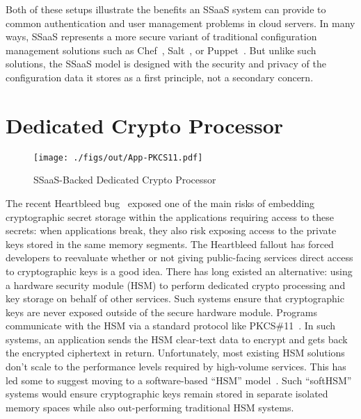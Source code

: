 Both of these setups illustrate the benefits an SSaaS system can
provide to common authentication and user management problems in cloud
servers. In many ways, SSaaS represents a more secure variant of
traditional configuration management solutions such as
Chef~\cite{chef}, Salt~\cite{salt}, or Puppet~\cite{puppet}. But
unlike such solutions, the SSaaS model is designed with the security
and privacy of the configuration data it stores as a first principle,
not a secondary concern.

\section{Dedicated Crypto Processor}

\begin{figure}[t]
  \centering
  \texttt{[image: ./figs/out/App-PKCS11.pdf]}
  \caption{SSaaS-Backed Dedicated Crypto Processor}
  \label{fig:app-pkcs11}
\end{figure}

The recent Heartbleed bug~\cite{heartbleed} exposed one of the main
risks of embedding cryptographic secret storage within the
applications requiring access to these secrets: when applications
break, they also risk exposing access to the private keys stored in
the same memory segments. The Heartbleed fallout has forced developers
to reevaluate whether or not giving public-facing services direct
access to cryptographic keys is a good idea. There has long existed an
alternative: using a hardware security module (HSM) to perform
dedicated crypto processing and key storage on behalf of other
services. Such systems ensure that cryptographic keys are never
exposed outside of the secure hardware module. Programs communicate
with the HSM via a standard protocol like
PKCS\#11~\cite{pcks11-standard}. In such systems, an application sends
the HSM clear-text data to encrypt and gets back the encrypted
ciphertext in return. Unfortunately, most existing HSM solutions don't
scale to the performance levels required by high-volume services. This
has led some to suggest moving to a software-based ``HSM''
model~\cite{lorier-pkcs11}. Such ``softHSM'' systems would ensure
cryptographic keys remain stored in separate isolated memory spaces
while also out-performing traditional HSM systems.

